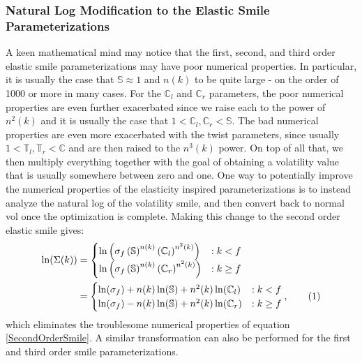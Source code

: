 \documentclass[12pt, a4paper, notitlepage]{article}
\numberwithin{equation}{subsection}
\numberwithin{figure}{subsection}
\numberwithin{table}{subsection}
\newcommand\numberthis{\addtocounter{equation}{1}\tag{\theequation}}
\newcommand{\newpar}{\newline \newline}
\begin{document}
\subsubsection{Natural Log Modification to the Elastic Smile Parameterizations}
A keen mathematical mind may notice that the first, second, and third order elastic smile parameterizations may have poor numerical properties.  In particular, it is usually the case that $\mathbb{S} \approx 1$ and $n(k)$ to be quite large - on the order of 1000 or more in many cases.  For the $\mathbb{C}_l$ and $\mathbb{C}_r$ parameters, the poor numerical properties are even further exacerbated since we raise each to the power of $n^{2}(k)$ and it is usually the case that $1 < \mathbb{C}_l,\mathbb{C}_r < \mathbb{S}$.  The bad numerical properties are even more exacerbated with the twist parameters, since usually $1 < \mathbb{T}_l,\mathbb{T}_r < \mathbb{C}$ and are then raised to the $n^{3}(k)$ power.  On top of all that, we then multiply everything together with the goal of obtaining a volatility value that is usually somewhere between zero and one.
\newpar
One way to potentially improve the numerical properties of the elasticity inspired parameterizations is to instead analyze the natural log of the volatility smile, and then convert back to normal vol once the optimization is complete.  Making this change to the second order elastic smile gives:
\begin{align*}
\ln(\Sigma(k)) 
&= 		\begin{cases}
			\ln\left(\sigma_f\left(\mathbb{S}\right)^{n(k)}\left(\mathbb{C}_l\right)^{n^{2}(k)}\right) & : k < f	\\
            \ln\left(\sigma_f\left(\mathbb{S}\right)^{n(k)}\left(\mathbb{C}_r\right)^{n^{2}(k)}\right) & : k \geq f	\\
        \end{cases} \\
&=		\begin{cases}
			\ln(\sigma_f) + n(k)\ln(\mathbb{S}) + n^{2}(k)\ln(\mathbb{C}_l) & : k < f	\\	
            \ln(\sigma_f) - n(k)\ln(\mathbb{S}) + n^{2}(k)\ln(\mathbb{C}_r) & : k \geq f	\\
        \end{cases}, \numberthis
\end{align*}
\label{SecondOrderSmileNaturalLog}
\newline
which eliminates the troublesome numerical properties of equation \ref{SecondOrderSmile}.  A similar transformation can also be performed for the first and third order smile parameterizations.
\end{document}
